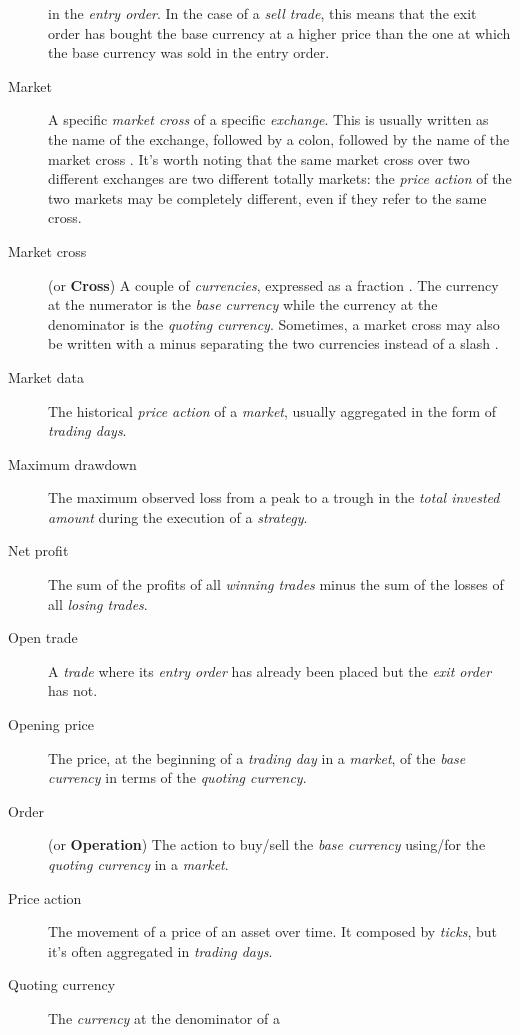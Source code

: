 \begin{description}
		in the \textit{entry order}. In the case of a \textit{sell
		trade}, this means that the exit order has bought the base
		currency at a higher price than the one at which the base
		currency was sold in the entry order.
	\item[Market] A specific \textit{market cross} of a specific
		\textit{exchange}. This is usually written as the name of the
		exchange, followed by a colon, followed by the name of the
		market cross . It's worth noting that
		the same market cross over two different exchanges are two
		different totally markets: the \textit{price action} of the two
		markets may be completely different, even if they refer to the
		same cross.
	\item[Market cross] (or \textbf{Cross}) A couple of \textit{currencies},
		expressed as a fraction .  The
		currency at the numerator is the \textit{base currency} while
		the currency at the denominator is the \textit{quoting
		currency}. Sometimes, a market cross may also be written with a
		minus separating the two currencies instead of a slash
		.
	\item[Market data] The historical \textit{price action} of a
		\textit{market}, usually aggregated in the form of
		\textit{trading days}.
	\item[Maximum drawdown] The maximum observed loss from a peak to a
		trough in the \textit{total invested amount} during the
		execution of a \textit{strategy}.
	\item[Net profit] The sum of the profits of all \textit{winning trades}
		minus the sum of the losses of all \textit{losing trades}.
	\item[Open trade] A \textit{trade} where its \textit{entry order} has
		already been placed but the \textit{exit order} has not.
	\item[Opening price] The price, at the beginning of a \textit{trading
		day} in a \textit{market}, of the \textit{base currency} in
		terms of the \textit{quoting currency}.
	\item[Order] (or \textbf{Operation}) The action to buy/sell the
		\textit{base currency} using/for the \textit{quoting currency}
		in a \textit{market}.
	\item[Price action] The movement of a price of an asset over time. It
		composed by \textit{ticks}, but it's often aggregated in
		\textit{trading days}.
	\item[Quoting currency] The \textit{currency} at the denominator of a

\end{description}
